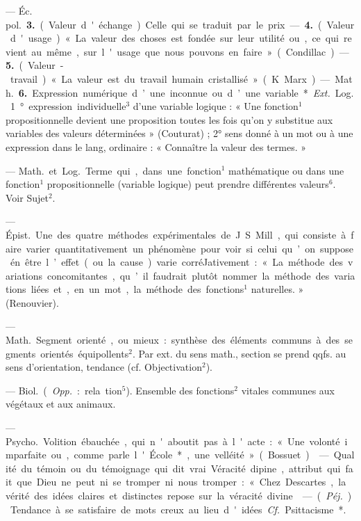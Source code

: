 \begin{itemize}[leftmargin=1cm, label=, itemsep=1pt]
— \si{Éc. pol.}  {\bf 3.} (Valeur d'échange).
Celle qui se traduit par le prix. —
 {\bf 4.} (Valeur d'usage). « La valeur des
choses est fondée sur leur utilité ou,
ce qui revient au même, sur l'usage
que nous pouvons en faire » (Condillac). —  {\bf 5.} (Valeur-travail). « La
valeur est du travail humain cristallisé » (K. Marx).

— \si{Math.}  {\bf 6.} Expression numérique d’une inconnue ou d’une variable*. {\it Ext.} \si{Log.} 1° expression
individuelle$^3$ d’une variable logique : « Une fonction$^1$ propositionnelle devient une proposition toutes
les fois qu'on y substitue aux variables des valeurs déterminées »
(Couturat) ; 2° sens donné à un mot
ou à une expression dans le lang,
ordinaire : « Connaître la valeur des
termes. »

 — \si{Math.} et \si{Log.} Terme qui,
dans une fonction$^1$ mathématique
ou dans une fonction$^1$ propositionnelle (variable logique) peut prendre
différentes valeurs$^6$. Voir Sujet$^2$.

 — \si{Épist.} Une des quatre
méthodes expérimentales de
J. S. Mill, qui consiste à faire varier
quantitativement un phénomène
pour voir si celui qu’on suppose én
être l’effet (ou la cause) varie corréJativement : « La méthode des variations concomitantes, qu’il faudrait
plutôt nommer la méthode des variations liées et, en un mot, la méthode des fonctions$^1$ naturelles. »
(Renouvier).

 — \si{Math.} Segment orienté,
ou mieux : synthèse des éléments
communs à des segments orientés
équipollents$^2$. Par ext. du sens math.,
section se prend qqfs. au sens d’orientation, tendance (cf. Objectivation$^2$).

 — \si{Biol.} ({\it Opp.} : rela
tion$^5$). Ensemble des fonctions$^2$ vitales communes aux végétaux et
aux animaux.

 — \si{Psycho.} Volition ébauchée,
qui n'aboutit pas à l'acte : « Une
volonté imparfaite ou, comme parle
l'École*, une velléité » (Bossuet).

 — Qualité du témoin ou du
témoignage qui dit vrai. Véracité
dipine, attribut qui fait que Dieu
ne peut ni se tromper ni nous tromper : « Chez Descartes, la vérité des
idées claires et distinctes repose sur
la véracité divine.

 — ({\it Péj.}) Tendance à se
satisfaire de mots creux au lieu
d'idées. {\it Cf.} Psittacisme*.


\end{itemize}
